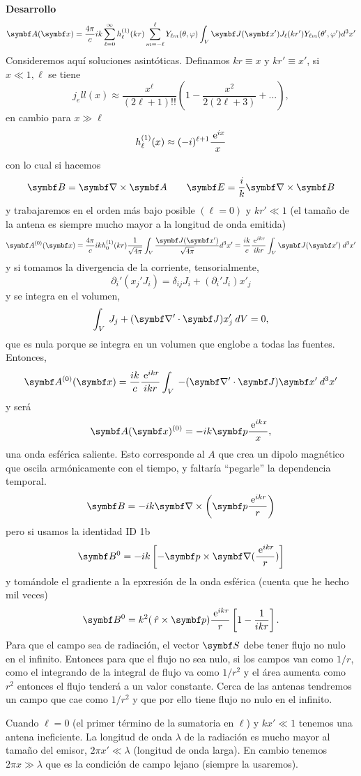 \documentclass[10pt,oneside]{CBFT_book}
\begin{document}
\begin{ejemplo}{\bf Desarrollo}
\[
	\vb{A}(\vbx) = \frac{4\pi}{c} i k 
	\sum_{\ell=0}^\infty h^{(1)}_\ell(kr) \sum_{m=-\ell}^{\ell} Y_{\ell m}(\theta,\vp)
	\int_V \vb{J}(\vbx') J_\ell(kr') Y_{\ell m}(\theta',\vp') d^3x' 
\]
Consideremos aquí soluciones asintóticas. Definamos $ kr \equiv x$ y $ kr' \equiv x'$,
si $x \ll 1, \ell$ se tiene
\[
	j_ell(x) \approx \frac{x^\ell}{(2\ell+1)!!}\left( 1 - \frac{x^2}{2(2\ell+3)} + ...\right),
\]
en cambio para $ x \gg \ell $
\[
	h^{(1)}_\ell(x) \approx (-i)^{\ell+1} \frac{\:\mathrm{e}^{ix}}{x}
\]
con lo cual si hacemos
\[
	\vb{B} = \rotorm{A} \qquad \vb{E} = \frac{i}{k}\rotorm{B}
\]
y trabajaremos en el orden más bajo posible $(\ell=0)$ y $ k r' \ll 1$ (el tamaño de la antena es siempre
mucho mayor a la longitud de onda emitida)
\[
	\vb{A}^{(0)}(\vbx) = \frac{4\pi}{c} i k 
	h^{(1)}_0(kr) \frac{1}{\sqrt{4\pi}} \int_V \frac{ \vb{J}(\vbx') }{\sqrt{4\pi}} d^3x' =
	\frac{ i k }{c} \frac{\euler^{ikr}}{ikr} \int_V \vb{J}(\vbx') \: d^3x'
\]
y si tomamos la divergencia de la corriente, tensorialmente, 
\[
	\partial_i'(x_j'J_i) = \delta_{ij}J_i + ( \partial_i'J_i ) x'_j
\]
y se integra en el volumen,
\[
	\int_V \:  J_j + (\Nabla'\cdot\vb{J}) x_j' \: dV = 0,
\]
que es nula porque se integra en un volumen que englobe a todas las fuentes.
Entonces,
\[
	\vb{A}^{(0)}(\vbx) = \frac{ i k }{c} \frac{\euler^{ikr}}{ikr} \int_V \: -(\Nabla'\cdot\vb{J}) \vbx' \: d^3x'
\]
y será
\[
	\vb{A}(\vb{x})^{(0)} = - i k \vb{p} \frac{\euler^{ikx}}{x},
\]
una onda esférica saliente.
Esto corresponde al $A$ que crea un dipolo magnético que oscila armónicamente con el tiempo,
y faltaría ``pegarle'' la dependencia temporal.
\[
	\vb{B} = - i k \Nabla \times \left( \vb{p} \frac{\euler^{ikr}}{r} \right)
\]
pero si usamos la identidad ID 1b 
\[
	\vb{B}^0 = - i k \left[ 
	- \vb{p} \times \Nabla( \frac{\euler^{ikr}}{r} )
	\right]
\]
y tomándole el gradiente a la epxresión de la onda esférica (cuenta que he hecho mil veces)
\[
	\vb{B}^0 = k^2 (\rver\times\vb{p})  \frac{\euler^{ikr}}{r} \left[ 1 - \frac{1}{ikr} \right].
\]
Para que el campo sea de radiación, el vector $\vb{S}$ debe tener flujo no nulo en el infinito.
Entonces para que el flujo no sea nulo, si los campos van como $1/r$, como el integrando de la integral
de flujo va como $1/r^2$ y el área aumenta como $r^2$ entonces el flujo tenderá a un valor constante.
Cerca de las antenas tendremos un campo que cae como $1/r^2$ y que por ello tiene flujo no nulo
en el infinito.

\end{ejemplo}


Cuando $\ell = 0$ (el primer término de la sumatoria en $\ell$) y
$ kx' \ll 1$ tenemos una antena ineficiente. La longitud de onda $\lambda$ de la radiación es mucho mayor al 
tamaño del emisor, $ 2\pi x' \ll \lambda$ (longitud de onda larga).
En cambio tenemos $ 2\pi x \gg \lambda$ que es la condición de campo lejano (siempre la usaremos).
\end{document}
